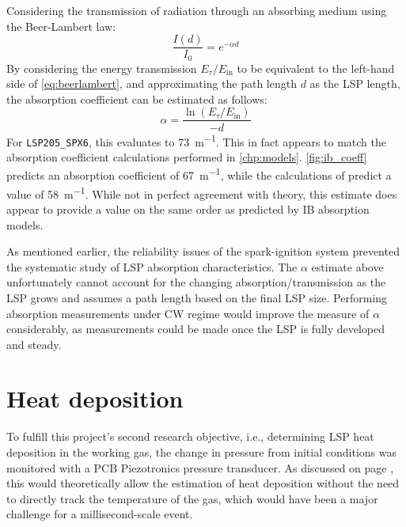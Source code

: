             Considering the transmission of radiation through an absorbing medium using the Beer-Lambert law:
            \begin{equation} \label{eq:beerlambert}
                \frac{I(d)}{I_0} = e^{-\alpha d}
            \end{equation}
            By considering the energy transmission $E_\tau/E_\mathrm{in}$ to be equivalent to the left-hand side of \autoref{eq:beerlambert}, and approximating the path length $d$ as the LSP length, the absorption coefficient can be estimated as follows:
            \begin{equation}
                \alpha = \frac{\ln{(E_\tau/E_\mathrm{in})}}{-d}
            \end{equation}
            For \texttt{LSP205\_SPX6}, this evaluates to \qty{73}{m^{-1}}. This in fact appears to match the absorption coefficient calculations performed in \autoref{chp:models}. \autoref{fig:ib_coeff} predicts an absorption coefficient of \qty{67}{m^{-1}}, while the calculations of \textcite{matsuiGeneratingConditionsArgon2019} predict a value of \qty{58}{m^{-1}}. While not in perfect agreement with theory, this estimate does appear to provide a value on the same order as predicted by IB absorption models.

            As mentioned earlier, the reliability issues of the spark-ignition system prevented the systematic study of LSP absorption characteristics. The $\alpha$ estimate above unfortunately cannot account for the changing absorption/transmission as the LSP grows and assumes a path length based on the final LSP size. Performing absorption measurements under CW regime would improve the measure of $\alpha$ considerably, as measurements could be made once the LSP is fully developed and steady.

    \section{Heat deposition} \label{sec:heate_deposition}
        To fulfill this project's second research objective, i.e., determining LSP heat deposition in the working gas, the change in pressure from initial conditions was monitored with a PCB Piezotronics pressure transducer. As discussed on page \pageref{sec:design_pressuresensor}, this would theoretically allow the estimation of heat deposition without the need to directly track the temperature of the gas, which would have been a major challenge for a millisecond-scale event.

